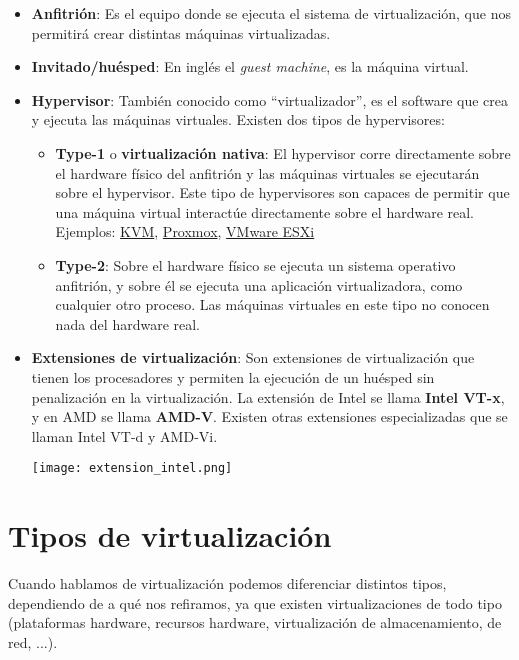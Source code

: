 \begin{itemize}
    \item \textbf{Anfitrión}: Es el equipo donde se ejecuta el sistema de virtualización, que nos permitirá crear distintas máquinas virtualizadas.

    \item \textbf{Invitado/huésped}: En inglés el \textit{guest machine}, es la máquina virtual.

    \item \textbf{Hypervisor}: También conocido como “virtualizador”, es el software que crea y ejecuta las máquinas virtuales. Existen dos tipos de hypervisores:
    \begin{itemize}
        \item \textbf{Type-1} o \textbf{virtualización nativa}: El hypervisor corre directamente sobre el hardware físico del anfitrión y las máquinas virtuales se ejecutarán sobre el hypervisor. Este tipo de hypervisores son capaces de permitir que una máquina virtual interactúe directamente sobre el hardware real. Ejemplos: \href{https://en.wikipedia.org/wiki/Kernel-based_Virtual_Machine}{KVM}, \href{https://en.wikipedia.org/wiki/Proxmox_Virtual_Environment}{Proxmox}, \href{https://en.wikipedia.org/wiki/VMware_ESXi}{VMware ESXi}

        \item \textbf{Type-2}: Sobre el hardware físico se ejecuta un sistema operativo anfitrión, y sobre él se ejecuta una aplicación virtualizadora, como cualquier otro proceso. Las máquinas virtuales en este tipo no conocen nada del hardware real.
    \end{itemize}

    \item \textbf{Extensiones de virtualización}: Son extensiones de virtualización que tienen los procesadores y permiten la ejecución de un huésped sin penalización en la virtualización. La extensión de Intel se llama \textbf{Intel VT-x}, y en AMD se llama \textbf{AMD-V}. Existen otras extensiones especializadas que se llaman Intel VT-d y AMD-Vi.

    \begin{center}
        \texttt{[image: extension\_intel.png]}
    \end{center}
\end{itemize}

\section{Tipos de virtualización}
Cuando hablamos de virtualización podemos diferenciar distintos tipos, dependiendo de a qué nos refiramos, ya que existen virtualizaciones de todo tipo (plataformas hardware, recursos hardware, virtualización de almacenamiento, de red, ...).


